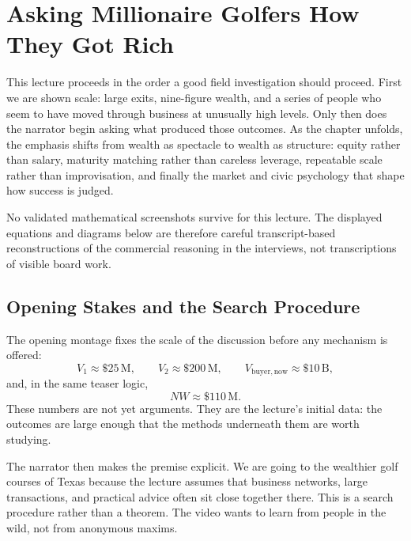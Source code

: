 \chapter{Asking Millionaire Golfers How They Got Rich}

This lecture proceeds in the order a good field investigation should proceed. First we are shown scale: large exits, nine-figure wealth, and a series of people who seem to have moved through business at unusually high levels. Only then does the narrator begin asking what produced those outcomes. As the chapter unfolds, the emphasis shifts from wealth as spectacle to wealth as structure: equity rather than salary, maturity matching rather than careless leverage, repeatable scale rather than improvisation, and finally the market and civic psychology that shape how success is judged.

\begin{remark}
No validated mathematical screenshots survive for this lecture. The displayed equations and diagrams below are therefore careful transcript-based reconstructions of the commercial reasoning in the interviews, not transcriptions of visible board work.
\end{remark}

\section{Opening Stakes and the Search Procedure}

The opening montage fixes the scale of the discussion before any mechanism is offered:
\begin{equation}
V_1 \approx \$25\,\mathrm{M}, \qquad
V_2 \approx \$200\,\mathrm{M}, \qquad
V_{\mathrm{buyer,now}} \approx \$10\,\mathrm{B},
\end{equation}
and, in the same teaser logic,
\begin{equation}
NW \approx \$110\,\mathrm{M}.
\end{equation}
These numbers are not yet arguments. They are the lecture's initial data: the outcomes are large enough that the methods underneath them are worth studying.

The narrator then makes the premise explicit. We are going to the wealthier golf courses of Texas because the lecture assumes that business networks, large transactions, and practical advice often sit close together there. This is a search procedure rather than a theorem. The video wants to learn from people in the wild, not from anonymous maxims.


